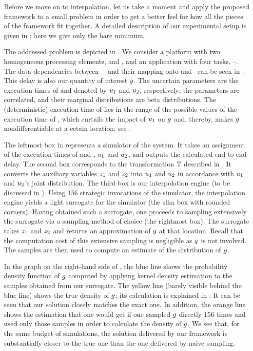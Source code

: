 Before we move on to interpolation, let us take a moment and apply the proposed
framework to a small problem in order to get a better feel for how all the
pieces of the framework fit together. A detailed description of our experimental
setup is given in ; here we give only the bare minimum.

\newcommand{\cores}{\token{PE1} and \token{PE2}}
\newcommand{\tasks}{\token{T1}--\token{T4}}
The addressed problem is depicted in . We consider a platform with
two homogeneous processing elements, \cores, and an application with four tasks,
\tasks. The data dependencies between \tasks\ and their mapping onto \cores\ can
be seen in . This delay is also our quantity of interest $g$. The
uncertain parameters are the execution times of  and 
denoted by $u_1$ and $u_2$, respectively; the parameters are correlated, and
their marginal distributions are beta distributions. The (deterministic)
execution time of  lies in the range of the possible values of the
execution time of , which curtails the impact of $u_1$ on $g$ and,
thereby, makes $g$ nondifferentiable at a cetain location; see
.

The leftmost box in  represents a simulator of the system. It
takes an assignment of the execution times of  and , $u_1$
and $u_2$, and outputs the calculated end-to-end delay. The second box
corresponds to the transformation $\mathbb{T}$ described in
. It converts the auxiliary variables $z_1$ and $z_2$ into
$u_1$ and $u_2$ in accordance with $u_1$ and $u_2$'s joint distribution. The
third box is our interpolation engine (to be discussed in ).
Using 156 strategic invocations of the simulator, the interpolation engine
yields a light surrogate for the simulator (the slim box with rounded corners).
Having obtained such a surrogate, one proceeds to sampling extensively the
surrogate via a sampling method of choice (the rightmost box). The surrogate
takes $z_1$ and $z_2$ and returns an approximation of $g$ at that location.
Recall that the computation cost of this extensive sampling is negligible as
$g$ is not involved. The samples are then used to compute an estimate of the
distribution of $g$.

In the graph on the right-hand side of , the blue line shows the
probability density function of $g$ computed by applying kernel density
estimation to the samples obtained from our surrogate. The yellow line (barely
visible behind the blue line) shows the true density of $g$; its calculation is
explained in . It can be seen that our solution closely
matches the exact one. In addition, the orange line shows the estimation that
one would get if one sampled $g$ directly 156 times and used only those samples
in order to calculate the density of $g$. We see that, for the same budget of
simulations, the solution delivered by our framework is substantially closer to
the true one than the one delivered by naive sampling.
